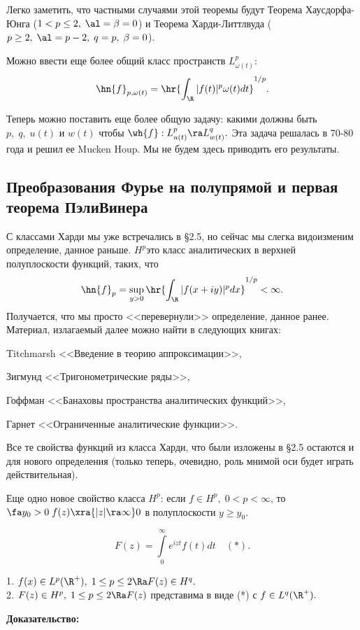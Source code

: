 \documentclass[a4paper]{article}
\begin{document}
\begin{wrapfigure}[10]{l}{220pt}
\end{wrapfigure}

Легко заметить, что частными случаями этой теоремы будут Теорема Хаусдорфа-Юнга ($1<p\le2,\;\al=\beta=0$)
и Теорема Харди-Литтлвуда ($p\ge2,\;\al=p-2,\;q=p,\;\beta=0$).

Можно ввести еще более общий класс пространств $L^p_{\omega(t)}$:
$$\hn{f}_{p,\omega(t)}=\hr{\int_{\R }|f(t)|^p\omega(t)dt}^{1/p}.$$

Теперь можно поставить еще более общую задачу: какими должны быть $p,\;q,\;u(t)$ и $w(t)$ чтобы
$\wh{f}:L^p_{u(t)}\ra L^q_{w(t)}.$ Эта задача решалась в 70-80 года и решил ее Mucken Houp. Мы
не будем здесь приводить его результаты.

\subsection{Преобразования Фурье на полупрямой и первая теорема Пэли\ч Винера}
С классами Харди мы уже встречались в \S2.5, но сейчас мы слегка видоизменим определение, данное раньше.
$H^p$\т это класс аналитических в верхней полуплоскости функций, таких, что
$$\hn{f}_p=\sup_{y>0}\hr{\int_{\R }|f(x+iy)|^pdx}^{1/p}<\infty. $$
Получается, что мы просто <<перевернули>> определение, данное ранее. Материал, излагаемый далее можно найти в
следующих книгах:

\medskip
Titchmarsh <<Введение в  теорию аппроксимации>>,

Зигмунд <<Тригонометрические ряды>>,

Гоффман <<Банаховы пространства аналитических функций>>,

Гарнет <<Ограниченные аналитические функции>>.

\medskip
Все те свойства функций из класса Харди, что были изложены в \S2.5 остаются и для нового определения (только
теперь, очевидно, роль мнимой оси будет играть действительная).

Еще одно новое свойство класса $H^p$: если $f\in H^p,\;0<p<\infty$, то $\fa
y_0>0\;f(z)\xra{|z|\ra\infty}0$ в полуплоскости $y\ge y_0.$

$$F(z)=\int\limits_0^{\infty}e^{izt}f(t)dt\quad (*).$$

\begin{theorems}\label{104}
1. $f(x)\in L^p(\R ^+),\;1\le p\le2\Ra F(z)\in H^q.$ \\\hangindent=2.3cm 2. $F(z)\in
H^p,\;1\le p\le2\Ra F(z)$ представима в виде (*) с $f\in L^q(\R ^+).$
\end{theorems}
\textbf{Доказательство:}
\end{document}
